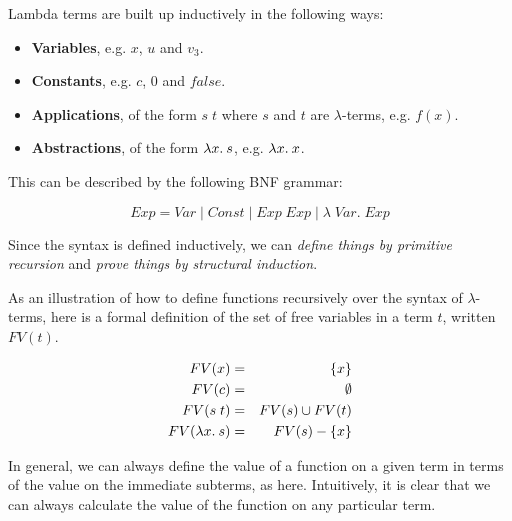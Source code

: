 \begin{slide*}


\vspace*{0.5cm}

Lambda terms are built up inductively in the following ways:

\begin{itemize}

\item {\bf Variables}, e.g. {\red $x$}, {\red $u$} and {\red $v_3$}.

\item {\bf Constants}, e.g. {\red $c$}, {\red $0$} and {\red $false$}.

\item {\bf Applications}, of the form {\red $s\; t$} where {\red $s$} and {\red
$t$} are $\lambda$-terms, e.g. {\red $f(x)$}.

\item {\bf Abstractions}, of the form {\red $\lambda x.\: s$}, e.g. {\red $\lambda x.\:
x$}.

\end{itemize}

This can be described by the following BNF grammar:

{\red $$ Exp = Var \mid Const \mid Exp\; Exp \mid \lambda\; Var . \; Exp $$}

Since the syntax is defined inductively, we can {\em define things by
primitive recursion} and {\em prove things by structural induction}.

\end{slide*}



\begin{slide*}


\vspace*{0.5cm}

As an illustration of how to define functions recursively over the
syntax of $\lambda$-terms, here is a formal definition of the set of free
variables in a term {\red $t$}, written {\red $FV(t)$}.

\begin{red}
\begin{eqnarray*}
   FV(x)          & = & \{ x \}                 \\
   FV(c)          & = & \emptyset               \\
   FV(s\; t)      & = & FV(s) \cup FV(t)      \\
   FV(\lambda x.\: s) & = & FV(s) - \{ x \}
\end{eqnarray*}
\end{red}

In general, we can always define the value of a function on a given term
in terms of the value on the immediate subterms, as here. Intuitively, it
is clear that we can always calculate the value of the function on any
particular term.

\end{slide*}




